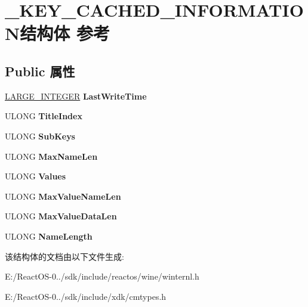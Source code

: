 \hypertarget{struct___k_e_y___c_a_c_h_e_d___i_n_f_o_r_m_a_t_i_o_n}{}\section{\+\_\+\+K\+E\+Y\+\_\+\+C\+A\+C\+H\+E\+D\+\_\+\+I\+N\+F\+O\+R\+M\+A\+T\+I\+O\+N结构体 参考}
\label{struct___k_e_y___c_a_c_h_e_d___i_n_f_o_r_m_a_t_i_o_n}
\subsection*{Public 属性}
\begin{DoxyCompactItemize}
\item 
\mbox{\label{struct___k_e_y___c_a_c_h_e_d___i_n_f_o_r_m_a_t_i_o_n_a3db75da086aa09f40e2eac548853ed1d}} 
\hyperlink{union___l_a_r_g_e___i_n_t_e_g_e_r}{L\+A\+R\+G\+E\+\_\+\+I\+N\+T\+E\+G\+ER} {\bfseries Last\+Write\+Time}
\item 
\mbox{\label{struct___k_e_y___c_a_c_h_e_d___i_n_f_o_r_m_a_t_i_o_n_a1bc30d09d034ac1718ccf1e006e811c1}} 
U\+L\+O\+NG {\bfseries Title\+Index}
\item 
\mbox{\label{struct___k_e_y___c_a_c_h_e_d___i_n_f_o_r_m_a_t_i_o_n_a79103adde79a357ec5733d30dcad1612}} 
U\+L\+O\+NG {\bfseries Sub\+Keys}
\item 
\mbox{\label{struct___k_e_y___c_a_c_h_e_d___i_n_f_o_r_m_a_t_i_o_n_acb6c9bc98ddbce0be3855433dacb8c25}} 
U\+L\+O\+NG {\bfseries Max\+Name\+Len}
\item 
\mbox{\label{struct___k_e_y___c_a_c_h_e_d___i_n_f_o_r_m_a_t_i_o_n_a623d61e597860dc1c4324ca0fca8839e}} 
U\+L\+O\+NG {\bfseries Values}
\item 
\mbox{\label{struct___k_e_y___c_a_c_h_e_d___i_n_f_o_r_m_a_t_i_o_n_a3bf12565baba4d670e5d9958f08d37d2}} 
U\+L\+O\+NG {\bfseries Max\+Value\+Name\+Len}
\item 
\mbox{\label{struct___k_e_y___c_a_c_h_e_d___i_n_f_o_r_m_a_t_i_o_n_a9d08132122db894c15f1811e4be64bdb}} 
U\+L\+O\+NG {\bfseries Max\+Value\+Data\+Len}
\item 
\mbox{\label{struct___k_e_y___c_a_c_h_e_d___i_n_f_o_r_m_a_t_i_o_n_ac01176e59a954b4eb265b4201f9d74df}} 
U\+L\+O\+NG {\bfseries Name\+Length}
\end{DoxyCompactItemize}


该结构体的文档由以下文件生成\+:\begin{DoxyCompactItemize}
\item 
E\+:/\+React\+O\+S-\/0../sdk/include/reactos/wine/winternl.\+h\item 
E\+:/\+React\+O\+S-\/0../sdk/include/xdk/cmtypes.\+h\end{DoxyCompactItemize}
